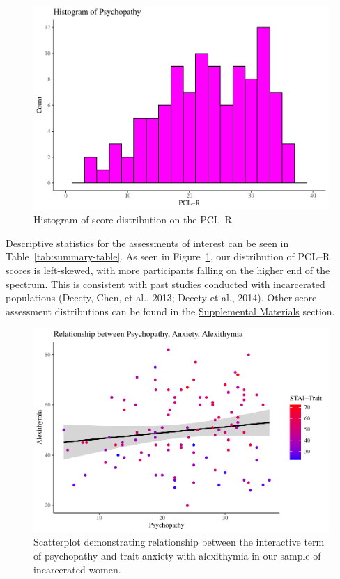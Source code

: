 \documentclass[
  man,floatsintext]{apa7}
\begin{document}
\begin{figure}
\includegraphics[width=1\linewidth]{d2m-Psychopathy_files/figure-latex/PCLR-descriptives-1} \caption{Histogram of score distribution on the PCL--R.}\label{fig:PCLR-descriptives}
\end{figure}

Descriptive statistics for the assessments of interest can be seen in Table~\ref{tab:summary-table}. As seen in Figure~\ref{fig:PCLR-descriptives}, our distribution of PCL--R scores is left-skewed, with more participants falling on the higher end of the spectrum. This is consistent with past studies conducted with incarcerated populations (Decety, Chen, et al., 2013; Decety et al., 2014). Other score assessment distributions can be found in the \protect\hyperlink{Supplemental-Materials}{Supplemental Materials} section.









\begin{figure}
\includegraphics[width=1\linewidth]{d2m-Psychopathy_files/figure-latex/c-path-scatterplot-1} \caption{Scatterplot demonstrating relationship between the interactive term of psychopathy and trait anxiety with alexithymia in our sample of incarcerated women.}\label{fig:c-path-scatterplot}
\end{figure}
\end{document}
